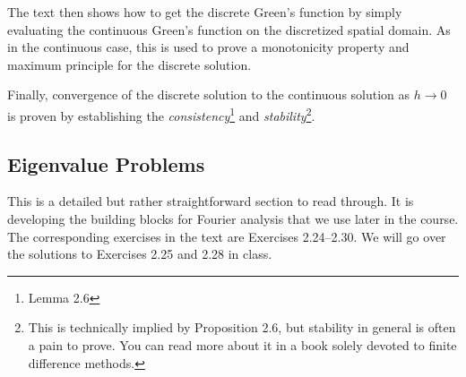 \documentclass{amsart}
\theoremstyle{plain}
\theoremstyle{definition}
\theoremstyle{remark}
\theoremstyle{definition}
\numberwithin{equation}{section}
\numberwithin{equation}{section}
\begin{document}
The text then shows how to get the discrete Green's function by simply evaluating the continuous Green's function on the discretized spatial domain. 
As in the continuous case, this is used to prove a monotonicity property and maximum principle for the discrete solution. 

Finally, convergence of the discrete solution to the continuous solution as $h\to 0$ is proven by establishing the {\em consistency}\footnote{Lemma 2.6} and {\em stability}\footnote{This is technically implied by Proposition 2.6, but stability in general is often a pain to prove. You can read more about it in a book solely devoted to finite difference methods.}.


\subsection{Eigenvalue Problems}

This is a detailed but rather straightforward section to read through.
It is developing the building blocks for Fourier analysis that we use later in the course.
The corresponding exercises in the text are Exercises 2.24--2.30. 
We will go over the solutions to Exercises 2.25 and 2.28 in class. 
\end{document}

